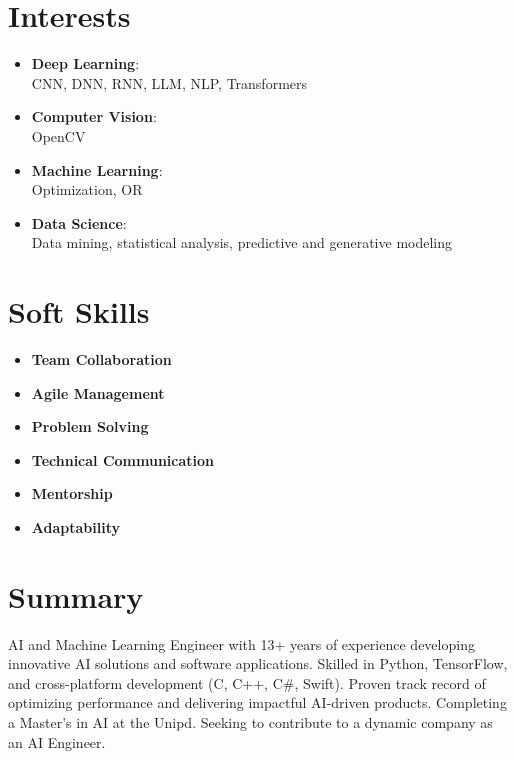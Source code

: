 \documentclass[a4paper]{article}
\begin{document}
\begin{paracol}{2}
\section*{Interests}
\begin{itemize}[left=18pt,label={}]
\setlength\itemsep{-0.05em}
    \item[\faBrain] \textbf{Deep Learning}: \\CNN, DNN, RNN, LLM, NLP, Transformers
    \item[\faEye] \textbf{Computer Vision}:\\ OpenCV
    \item[\faProjectDiagram] \textbf{Machine Learning}:\\ Optimization, OR
    \item[\faChartLine] \textbf{Data Science}:\\ Data mining, statistical analysis, predictive and generative modeling
\end{itemize}


\section*{Soft Skills}
\begin{itemize}[left=18pt,label={}]
\setlength\itemsep{-0.05em}
    \item[\faUsers] \textbf{Team Collaboration}
    \item[\faTasks] \textbf{Agile Management}
    \item[\faBug] \textbf{Problem Solving}
    \item[\faComments] \textbf{Technical Communication}
    \item[\faChalkboardTeacher] \textbf{Mentorship}
    \item[\faRocket] \textbf{Adaptability}
\end{itemize}


\switchcolumn %


\section*{Summary}
AI and Machine Learning Engineer with 13+ years of experience developing innovative AI solutions and software applications. Skilled in Python, TensorFlow, and cross-platform development (C, C++, C\#, Swift). Proven track record of optimizing performance and delivering impactful AI-driven products. Completing a Master’s in AI at the Unipd. Seeking to contribute to a dynamic company as an AI Engineer.


\end{paracol}
\end{document}
